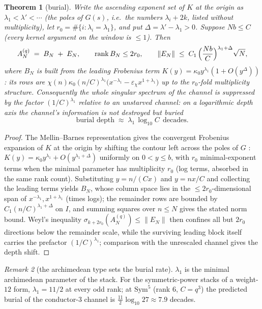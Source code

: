 \documentclass[11pt]{article}
\newtheorem{theorem}{Theorem}[section]
\theoremstyle{definition}
\theoremstyle{remark}
\newtheorem{remark}[theorem]{Remark}
\begin{document}
\begin{theorem}[burial]\label{thm:burial}
Write the ascending exponent set of $K$ at the origin as
$\lambda_1<\lambda'<\cdots$ (the poles of $G(s)$, i.e.\ the numbers
$\lambda_i+2k$, listed without multiplicity), let
$r_0=\#\{i:\lambda_i=\lambda_1\}$, and put $\Delta=\lambda'-\lambda_1>0$.
Suppose $Nb\le C$ (every kernel argument on the window is $\le1$).  Then
\[
A^{(q)}_N\;=\;B_N\;+\;E_N,\qquad
\operatorname{rank}B_N\le 2r_0,\qquad
\|E_N\|\;\le\;C_1\,\Bigl(\frac{Nb}{C}\Bigr)^{\lambda_1+\Delta}\sqrt{N},
\]
where $B_N$ is built from the leading Frobenius term
$K(y)=\kappa_0y^{\lambda_1}(1+O(y^{\Delta}))$: its rows are
$\chi(n)\kappa_0 (n/C)^{\lambda_1}\bigl(x^{-\lambda_1}-\varepsilon_\chi
x^{1+\lambda_1}\bigr)$ up to the $r_0$-fold multiplicity structure.
Consequently the whole singular spectrum of the channel is suppressed by the
factor $(1/C)^{\lambda_1}$ relative to an unstarved channel: on a logarithmic
depth axis the channel's information is not destroyed but \emph{buried}
\[
\text{burial depth}\;\approx\;\lambda_1\,\log_{10}C\ \ \text{decades}.
\]
\end{theorem}

\begin{proof}
The Mellin--Barnes representation gives the convergent Frobenius expansion
of $K$ at the origin by shifting the contour left across the poles of
$G$ \cite[Ch.~V]{Luke}: $K(y)=\kappa_0y^{\lambda_1}+O(y^{\lambda_1+\Delta})$
uniformly on $0<y\le b$, with $r_0$ minimal-exponent terms when the minimal
parameter has multiplicity $r_0$ (log terms, absorbed in the same rank
count).  Substituting $y=n/(Cx)$ and $y=nx/C$ and collecting the leading
terms yields $B_N$, whose column space lies in the $\le2r_0$-dimensional
span of $x^{-\lambda_1},x^{1+\lambda_1}$ (times logs); the remainder rows
are bounded by $C_1(n/C)^{\lambda_1+\Delta}$ on $I$, and summing squares
over $n\le N$ gives the stated norm bound.  Weyl's inequality
$\sigma_{k+2r_0}(A^{(q)}_N)\le\|E_N\|$ then confines all but $2r_0$
directions below the remainder scale, while the surviving leading block
itself carries the prefactor $(1/C)^{\lambda_1}$; comparison with the
unrescaled channel gives the depth shift.
\end{proof}

\begin{remark}[the archimedean type sets the burial rate]
$\lambda_1$ is the minimal archimedean parameter of the stack.  For the
symmetric-power stacks of a weight-$12$ form, $\lambda_1=11/2$ at every odd
rank; at $\mathrm{Sym}^5$ (rank $6$, $C=q^3$) the predicted burial of the
conductor-$3$ channel is $\tfrac{11}{2}\log_{10}27\approx7.9$ decades.
\end{remark}
\end{document}
